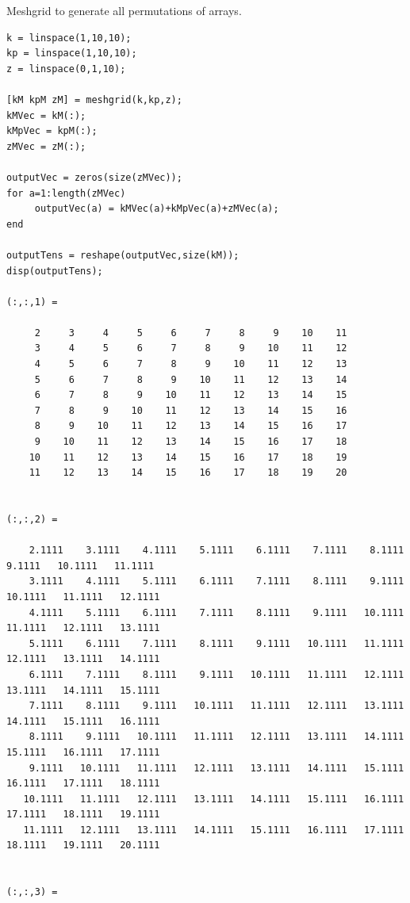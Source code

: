 \documentclass[
]{book}
\begin{document}
Meshgrid to generate all permutations of arrays.

\begin{verbatim}
k = linspace(1,10,10);
kp = linspace(1,10,10);
z = linspace(0,1,10);
 
[kM kpM zM] = meshgrid(k,kp,z);
kMVec = kM(:);
kMpVec = kpM(:);
zMVec = zM(:);
 
outputVec = zeros(size(zMVec));
for a=1:length(zMVec)
     outputVec(a) = kMVec(a)+kMpVec(a)+zMVec(a);
end
 
outputTens = reshape(outputVec,size(kM));
disp(outputTens);

(:,:,1) =

     2     3     4     5     6     7     8     9    10    11
     3     4     5     6     7     8     9    10    11    12
     4     5     6     7     8     9    10    11    12    13
     5     6     7     8     9    10    11    12    13    14
     6     7     8     9    10    11    12    13    14    15
     7     8     9    10    11    12    13    14    15    16
     8     9    10    11    12    13    14    15    16    17
     9    10    11    12    13    14    15    16    17    18
    10    11    12    13    14    15    16    17    18    19
    11    12    13    14    15    16    17    18    19    20


(:,:,2) =

    2.1111    3.1111    4.1111    5.1111    6.1111    7.1111    8.1111    9.1111   10.1111   11.1111
    3.1111    4.1111    5.1111    6.1111    7.1111    8.1111    9.1111   10.1111   11.1111   12.1111
    4.1111    5.1111    6.1111    7.1111    8.1111    9.1111   10.1111   11.1111   12.1111   13.1111
    5.1111    6.1111    7.1111    8.1111    9.1111   10.1111   11.1111   12.1111   13.1111   14.1111
    6.1111    7.1111    8.1111    9.1111   10.1111   11.1111   12.1111   13.1111   14.1111   15.1111
    7.1111    8.1111    9.1111   10.1111   11.1111   12.1111   13.1111   14.1111   15.1111   16.1111
    8.1111    9.1111   10.1111   11.1111   12.1111   13.1111   14.1111   15.1111   16.1111   17.1111
    9.1111   10.1111   11.1111   12.1111   13.1111   14.1111   15.1111   16.1111   17.1111   18.1111
   10.1111   11.1111   12.1111   13.1111   14.1111   15.1111   16.1111   17.1111   18.1111   19.1111
   11.1111   12.1111   13.1111   14.1111   15.1111   16.1111   17.1111   18.1111   19.1111   20.1111


(:,:,3) =


\end{verbatim}
\end{document}
